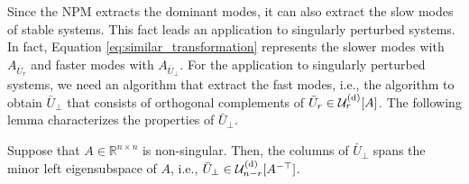 \documentclass{ifacconf}
\begin{document}
Since the NPM extracts the dominant modes, it can also extract the slow modes of stable systems.  This fact leads an application to singularly perturbed systems. 
In fact, Equation \eqref{eq:similar_transformation} represents the slower modes with $A_{\bar{U}_{r}}$ and faster modes with $A_{\bar{U}_{\perp}}$. 
For the application to singularly perturbed systems, we need an algorithm that extract the fast modes, i.e., the algorithm to obtain $\bar{U}_{\perp}$ that consists of orthogonal complements of $\bar{U}_{r} \in \mathcal{U}_{r}^{\rm (d)}[A]$. 
The following lemma characterizes the properties of $\bar{U}_{\perp}$. 




\begin{lem}\label{lem:fast_mode_extraction}
Suppose that $A\in \mathbb{R}^{n\times n}$ is non-singular. 
Then, the columns of $\bar{U}_{\perp} $ spans the minor left eigensubspace of $A$, i.e., $\bar{U}_{\perp} \in \mathcal{U}_{n-r}^{\rm (d)} [A^{-\top}]$. 
\end{lem}
\end{document}
